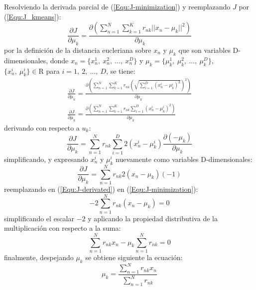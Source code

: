 Resolviendo la derivada parcial de (\ref{Equ:J-minimization}) y reemplazando 
$J$ por (\ref{Equ:J_kmeans}):
\begin{equation}
  \frac{\partial J}{\partial \mu_k} = \frac{\displaystyle\partial \left( \sum_{n=1}^N{\sum_{k=1}^K{r_{nk} ||x_n - \mu_k||^2 }} \right)}{\partial \mu_k}
\end{equation}
por la definición de la distancia eucleriana sobre $x_n$ y $\mu_k$ que son
variables D-dimensionales, donde 
$x_n = \lbrace x_n^1,~ x_n^2,~ \dots,~ x_n^D \rbrace$ y $\mu_k = \lbrace \mu_k^1,~ \mu_k^2,~ \dots,~ \mu_k^D \rbrace$, $\lbrace x_n^i,~ \mu_k^i \rbrace \in \mathrm{R}$ 
para $i=1,~ 2,~ \dots,~ D$, se tiene:
\begin{eqnarray}
\frac{\partial J}{\partial \mu_k} = \frac{\displaystyle\partial \left( \sum_{n=1}^N{\sum_{k=1}^K{r_{nk} \left(\sqrt{\sum_{i=1}^{D}{(x_n^i - \mu_k^i)^2}} \right)^2 }} \right)}{\partial \mu_k}\\
\frac{\partial J}{\partial \mu_k} = \frac{\displaystyle\partial \left( \sum_{n=1}^N{\sum_{k=1}^K{r_{nk} {\sum_{i=1}^{D}{(x_n^i - \mu_k^i)^2}}} }\right) }{\partial \mu_k}
\end{eqnarray}
derivando con respecto a $u_k$:
\begin{equation}
  \frac{\partial J}{\partial \mu_k} = \displaystyle  \sum_{n=1}^N{{r_{nk} {\sum_{i=1}^{D}{2(x_n^i - \mu_k^i) \frac{\partial (-\mu_k)}{\partial \mu_k}} }}}
\end{equation}
simplificando, y expresando $x_n^i$ y $\mu_k^i$ nuevamente como variables 
D-dimensionales:
\begin{equation}
  \frac{\partial J}{\partial \mu_k} = \displaystyle  \sum_{n=1}^N{{r_{nk} {2(x_n - \mu_k) (-1)}}}
  \label{Equ:J-derivated}
\end{equation}
reemplazando en (\ref{Equ:J-derivated}) en (\ref{Equ:J-minimization}):
\begin{equation}
  \displaystyle  -2\sum_{n=1}^N{{r_{nk} {(x_n - \mu_k)}}} = 0
\end{equation}
simplificando el escalar $-2$ y aplicando la propiedad distributiva de la 
multiplicación con respecto a la suma:
\begin{equation}
  \displaystyle  \sum_{n=1}^N{{r_{nk} x_n } - \mu_k\sum_{n=1}^N{{r_{nk}}}} = 0
\end{equation}
finalmente, despejando $\mu_k$ se obtiene siguiente la ecuación:
\begin{equation}
  \mu_k = \frac{\displaystyle\sum_{n=1}^N{{r_{nk} x_n }}}{\displaystyle \sum_{n=1}^N{{r_{nk}}}}
  \label{Equ:value-cluster}
\end{equation}

